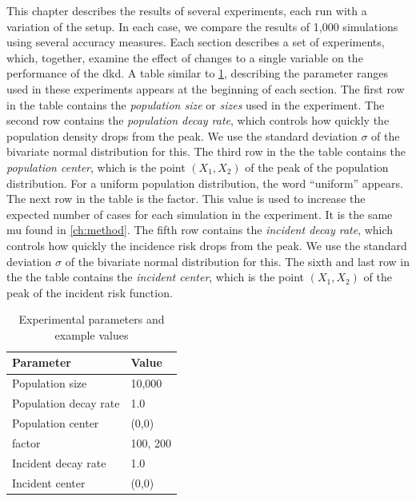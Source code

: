 

This chapter describes the results of several experiments, each run with a variation of the setup.
In each case, we compare the results of 1,000 simulations using several accuracy measures.
Each section describes a set of experiments, which, together, examine the effect of changes to a single variable on the performance of the \gls{dkd}.
A table similar to \cref{tab:params:template}, describing the parameter ranges used in these experiments appears at the beginning of each section.
The first row in the table contains the \textit{population size} or \textit{sizes} used in the experiment.
The second row contains the \textit{\gls{population decay rate}}, which controls how quickly the population density drops from the peak.
We use the standard deviation \(\sigma\) of the bivariate normal distribution for this.
The third row in the the table contains the \textit{population center}, which is the point \((X_1, X_2)\) of the peak of the population distribution.
For a uniform population distribution, the word ``uniform'' appears.
The next row in the table is the \gls{factor}.
This value is used to increase the expected number of cases for each simulation in the experiment.
It is the same \gls{mu} found in \cref{ch:method}.
The fifth row contains the \textit{\gls{incident decay rate}}, which controls how quickly the incidence risk drops from the peak.
We use the standard deviation \(\sigma\) of the bivariate normal distribution for this.
The sixth and last row in the the table contains the \textit{incident center}, which is the point \((X_1, X_2)\) of the peak of the incident risk function.

\begin{table}[htbp]
\centering
\begin{tabular}{ll}
\hline
Parameter & Value \\
\hline
Population size & 10,000 \\
Population decay rate & 1.0 \\
Population center & (0,0) \\
\Gls{factor} & 100, 200 \\
Incident decay rate & 1.0 \\
Incident center & (0,0) \\
\hline
\end{tabular}
\caption{Experimental parameters and example values}
\label{tab:params:template}
\end{table}


